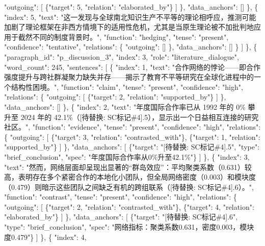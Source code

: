 \documentclass[12pt,a4paper]{article}
\begin{document}
            "outgoing": [
              \{"target": 5, "relation": "elaborated\_by"\}
            ]
          \},
          "data\_anchors": []
        \},
        \{
          "index": 5,
          "text": "这一发现与全球南北知识生产不平等的理论相呼应，推测可能加剧了理论框架在非西方情境下的适用性危机，尤其是当原生理论被不加批判地应用于截然不同的制度背景时。",
          "function": "hedging",
          "tense": "present",
          "confidence": "tentative",
          "relations": \{
            "outgoing": []
          \},
          "data\_anchors": []
        \}
      ]
    \},
    \{
      "paragraph\_id": "p\_discussion\_3",
      "index": 3,
      "role": "literature\_dialogue",
      "word\_count": 245,
      "sentences": [
        \{
          "index": 1,
          "text": "合作网络的悖论——即合作强度提升与跨社群凝聚力缺失并存——揭示了教育不平等研究在全球化进程中的一个结构性困境。",
          "function": "claim",
          "tense": "present",
          "confidence": "high",
          "relations": \{
            "outgoing": [
              \{"target": 2, "relation": "supported\_by"\}
            ]
          \},
          "data\_anchors": []
        \},
        \{
          "index": 2,
          "text": "年度国际合作率已从 1992 年的 0\% 攀升至 2024 年的 42.1\%（[待替换: SC标记\#4].5），显示出一个日益相互连接的研究社区。",
          "function": "evidence",
          "tense": "present",
          "confidence": "high",
          "relations": \{
            "outgoing": [
              \{"target": 3, "relation": "contrasted\_with"\},
              \{"target": 1, "relation": "supported\_by"\}
            ]
          \},
          "data\_anchors": [
            \{"target": "[待替换: SC标记\#4].5", "type": "brief\_conclusion", "spec": "年度国际合作率从0\%升至42.1\%"\}
          ]
        \},
        \{
          "index": 3,
          "text": "然而，网络层面却呈现出显著的“群岛效应”：平均聚类系数（0.631）较高，表明存在多个紧密合作的本地化小团队，但全局网络密度（0.003）和模块度（0.479）则暗示这些团队之间缺乏有机的跨组联系（[待替换: SC标记\#4].6）。",
          "function": "contrast",
          "tense": "present",
          "confidence": "high",
          "relations": \{
            "outgoing": [
              \{"target": 2, "relation": "contrasted\_with"\},
              \{"target": 4, "relation": "elaborated\_by"\}
            ]
          \},
          "data\_anchors": [
            \{"target": "[待替换: SC标记\#4].6", "type": "brief\_conclusion", "spec": "网络指标：聚类系数0.631，密度0.003，模块度0.479"\}
          ]
        \},
        \{
          "index": 4,
\end{document}
